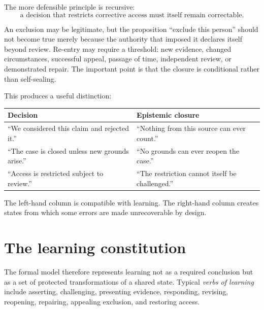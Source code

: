 \documentclass[11pt,a4paper]{article}
\begin{document}
The more defensible principle is recursive:
\[
\boxed{\text{a decision that restricts corrective access must itself remain correctable}.}
\]

An exclusion may be legitimate, but the proposition ``exclude this person'' should not become true merely because the authority that imposed it declares itself beyond review. Re-entry may require a threshold: new evidence, changed circumstances, successful appeal, passage of time, independent review, or demonstrated repair. The important point is that the closure is conditional rather than self-sealing.

This produces a useful distinction:
\begin{center}
\begin{tabular}{p{}p{}}
\toprule
\textbf{Decision} & \textbf{Epistemic closure}\\
\midrule
``We considered this claim and rejected it.'' & ``Nothing from this source can ever count.''\\
``The case is closed unless new grounds arise.'' & ``No grounds can ever reopen the case.''\\
``Access is restricted subject to review.'' & ``The restriction cannot itself be challenged.''\\
\bottomrule
\end{tabular}
\end{center}

The left-hand column is compatible with learning. The right-hand column creates states from which some errors are made unrecoverable by design.

\section{The learning constitution}

The formal model therefore represents learning not as a required conclusion but as a set of protected transformations of a shared state. Typical \emph{verbs of learning} include asserting, challenging, presenting evidence, responding, revising, reopening, repairing, appealing exclusion, and restoring access.
\end{document}
